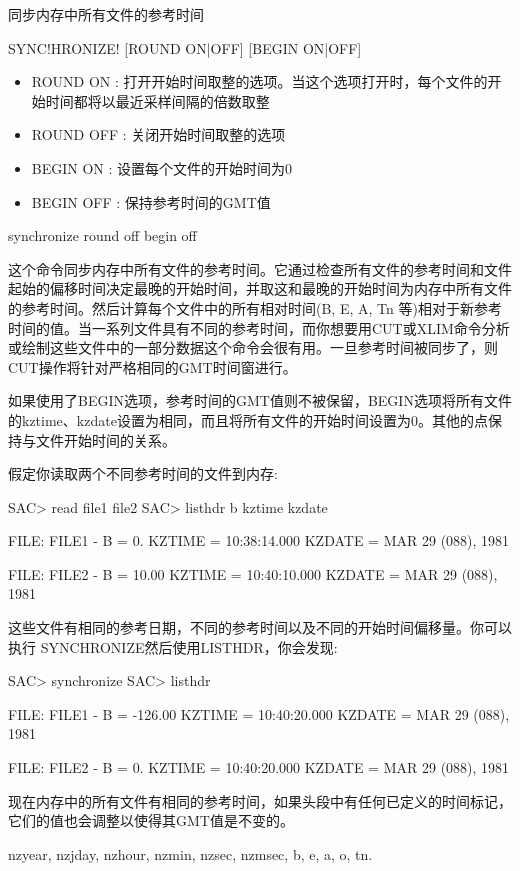 \label{cmd:synchronize}

同步内存中所有文件的参考时间

\begin{SACSTX}
SYNC!HRONIZE! [ROUND ON|OFF] [BEGIN ON|OFF]
\end{SACSTX}

\begin{itemize}
\item ROUND ON : 打开开始时间取整的选项。当这个选项打开时，每个文件的开始时间都将以最近采样间隔的倍数取整
\item ROUND OFF : 关闭开始时间取整的选项 
\item BEGIN {ON} : 设置每个文件的开始时间为0 
\item BEGIN OFF : 保持参考时间的GMT值 
\end{itemize}

\begin{SACDFT}
synchronize round off begin off
\end{SACDFT}

这个命令同步内存中所有文件的参考时间。它通过检查所有文件的参考时间和文件起始的偏移时间决定最晚的开始时间，并取这和最晚的开始时间为内存中所有文件的参考时间。然后计算每个文件中的所有相对时间(B, E, A, Tn 等)相对于新参考时间的值。当一系列文件具有不同的参考时间，而你想要用CUT或XLIM命令分析或绘制这些文件中的一部分数据这个命令会很有用。一旦参考时间被同步了，则CUT操作将针对严格相同的GMT时间窗进行。

如果使用了BEGIN选项，参考时间的GMT值则不被保留，BEGIN选项将所有文件的kztime、kzdate设置为相同，而且将所有文件的开始时间设置为0。其他的点保持与文件开始时间的关系。

假定你读取两个不同参考时间的文件到内存:
\begin{SACCode}
SAC> read file1 file2
SAC> listhdr b kztime kzdate

  FILE: FILE1
  -
  B = 0.
  KZTIME = 10:38:14.000
  KZDATE = MAR 29 (088), 1981

  FILE: FILE2
  -
  B = 10.00
  KZTIME = 10:40:10.000
  KZDATE = MAR 29 (088), 1981
\end{SACCode}

这些文件有相同的参考日期，不同的参考时间以及不同的开始时间偏移量。你可以执行	SYNCHRONIZE然后使用LISTHDR，你会发现:
\begin{SACCode}
SAC> synchronize
SAC> listhdr

  FILE: FILE1
  -
  B = -126.00
  KZTIME = 10:40:20.000
  KZDATE = MAR 29 (088), 1981

  FILE: FILE2
  -
  B = 0.
  KZTIME = 10:40:20.000
  KZDATE = MAR 29 (088), 1981
\end{SACCode}
现在内存中的所有文件有相同的参考时间，如果头段中有任何已定义的时间标记，它们的值也会调整以使得其GMT值是不变的。

nzyear, nzjday, nzhour, nzmin, nzsec, nzmsec, b, e, a, o, tn.
